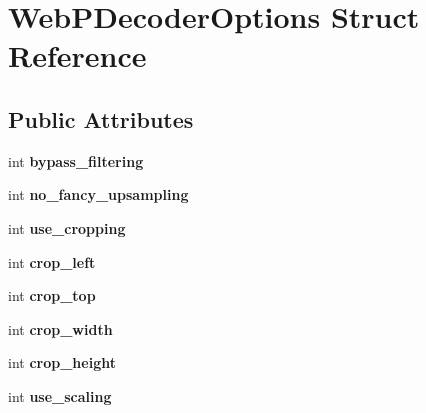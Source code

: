 \hypertarget{structWebPDecoderOptions}{}\section{Web\+P\+Decoder\+Options Struct Reference}
\label{structWebPDecoderOptions}
\subsection*{Public Attributes}
\begin{DoxyCompactItemize}
\item 
\mbox{\label{structWebPDecoderOptions_aa7198600635eb131715a00d9b84b597e}} 
int {\bfseries bypass\+\_\+filtering}
\item 
\mbox{\label{structWebPDecoderOptions_a76cd8b191fa024dec964cc83b3a915a9}} 
int {\bfseries no\+\_\+fancy\+\_\+upsampling}
\item 
\mbox{\label{structWebPDecoderOptions_a8cd44d127f1031145d5051d103318d6e}} 
int {\bfseries use\+\_\+cropping}
\item 
\mbox{\label{structWebPDecoderOptions_a20a29b56e5d3f0a90a15930ae7875ab1}} 
int {\bfseries crop\+\_\+left}
\item 
\mbox{\label{structWebPDecoderOptions_af6a5e6b6473fa67211d124fbf4a5136b}} 
int {\bfseries crop\+\_\+top}
\item 
\mbox{\label{structWebPDecoderOptions_a40f7ea075b4ead6c8bd671d9c91fb494}} 
int {\bfseries crop\+\_\+width}
\item 
\mbox{\label{structWebPDecoderOptions_a410f836b3b87a662195609ebc2597567}} 
int {\bfseries crop\+\_\+height}
\item 
\mbox{\label{structWebPDecoderOptions_a5ca628fdd33d53dc40d80904b2c9c161}} 
int {\bfseries use\+\_\+scaling}
\item 
\mbox{\label{structWebPDecoderOptions_aa9fb6586ac98345674332366be2da1d8}} 

\end{DoxyCompactItemize}
